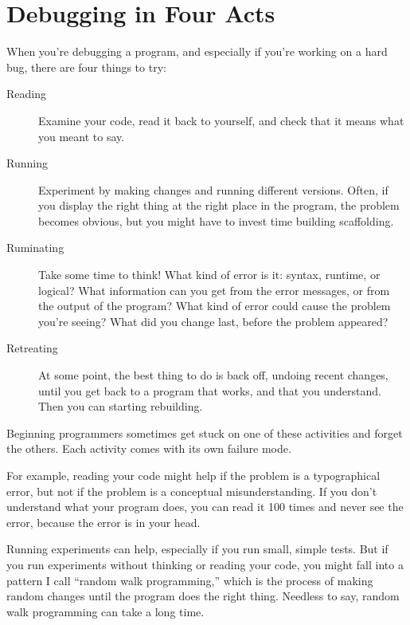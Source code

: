 \section{Debugging in Four Acts}


When you're debugging a program, and especially if you're working on a hard bug, there are four things to try:

\begin{description}

\item[Reading] Examine your code, read it back to yourself, and
check that it means what you meant to say.

\item[Running] Experiment by making changes and running different
versions.  Often, if you display the right thing at the right place
in the program, the problem becomes obvious, but you might have to invest time building scaffolding.

\item[Ruminating] Take some time to think!  What kind of error
is it: syntax, runtime, or logical?  What information can you get from
the error messages, or from the output of the program?  What kind of
error could cause the problem you're seeing?  What did you change
last, before the problem appeared?

\item[Retreating] At some point, the best thing to do is back
off, undoing recent changes, until you get back to a program that
works, and that you understand.  Then you can starting rebuilding.

\end{description}

Beginning programmers sometimes get stuck on one of these activities
and forget the others.  Each activity comes with its own failure
mode.

For example, reading your code might help if the problem is a
typographical error, but not if the problem is a conceptual
misunderstanding.  If you don't understand what your program does, you
can read it 100 times and never see the error, because the error is in
your head.

Running experiments can help, especially if you run small, simple
tests.  But if you run experiments without thinking or reading your
code, you might fall into a pattern I call ``random walk programming,''
which is the process of making random changes until the program
does the right thing.  Needless to say, random walk programming
can take a long time.

